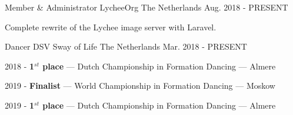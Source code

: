 
\begin{cventries}


  \cventry
    {Member \& Administrator} %
    {LycheeOrg} %
    {The Netherlands} %
    {Aug. 2018 - PRESENT} %
    {
      \begin{cvitems} %
        \item {Complete rewrite of the Lychee image server with Laravel.}
      \end{cvitems}
    }

  \cventry
    {Dancer} %
    {DSV Sway of Life} %
    {The Netherlands} %
    {Mar. 2018 - PRESENT} %
    {
      \begin{cvitems} %
        \item {2018 - \textbf{1$^{st}$ place} --- Dutch Championship in Formation Dancing --- Almere}
        \item {2019 - \textbf{Finalist} --- World Championship in Formation Dancing --- Moskow}
        \item {2019 - \textbf{1$^{st}$ place} --- Dutch Championship in Formation Dancing --- Almere}
      \end{cvitems}
    }


\end{cventries}
